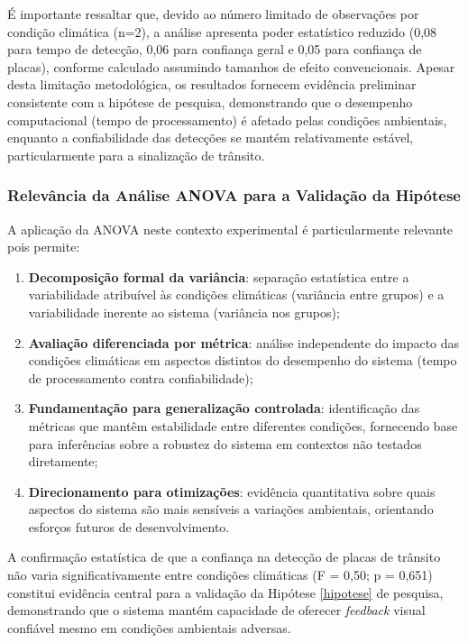 É importante ressaltar que, devido ao número limitado de observações por condição climática (n=2), a análise apresenta poder estatístico reduzido (0,08 para tempo de detecção, 0,06 para confiança geral e 0,05 para confiança de placas), conforme calculado assumindo tamanhos de efeito convencionais. Apesar desta limitação metodológica, os resultados fornecem evidência preliminar consistente com a hipótese de pesquisa, demonstrando que o desempenho computacional (tempo de processamento) é afetado pelas condições ambientais, enquanto a confiabilidade das detecções se mantém relativamente estável, particularmente para a sinalização de trânsito.

\subsubsection{Relevância da Análise ANOVA para a Validação da Hipótese}

A aplicação da ANOVA neste contexto experimental é particularmente relevante pois permite:

\begin{enumerate}
    \item \textbf{Decomposição formal da variância}: separação estatística entre a variabilidade atribuível às condições climáticas (variância entre grupos) e a variabilidade inerente ao sistema (variância nos grupos);
    
    \item \textbf{Avaliação diferenciada por métrica}: análise independente do impacto das condições climáticas em aspectos distintos do desempenho do sistema (tempo de processamento contra confiabilidade);
    
    \item \textbf{Fundamentação para generalização controlada}: identificação das métricas que mantêm estabilidade entre diferentes condições, fornecendo base para inferências sobre a robustez do sistema em contextos não testados diretamente;
    
    \item \textbf{Direcionamento para otimizações}: evidência quantitativa sobre quais aspectos do sistema são mais sensíveis a variações ambientais, orientando esforços futuros de desenvolvimento.
\end{enumerate}

A confirmação estatística de que a confiança na detecção de placas de trânsito não varia significativamente entre condições climáticas (F = 0,50; p = 0,651) constitui evidência central para a validação da Hipótese \ref{hipotese} de pesquisa, demonstrando que o sistema mantém capacidade de oferecer \textit{feedback} visual confiável mesmo em condições ambientais adversas.

